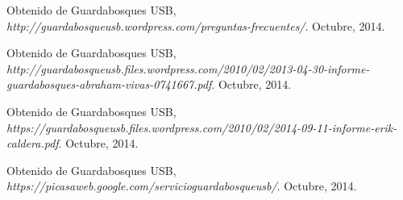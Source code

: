 \begin{thebibliography}{thesis}

  Obtenido de Guardabosques USB,
  \emph{http://guardabosqueusb.wordpress.com/preguntas-frecuentes/}.
  Octubre, 2014.
  
  Obtenido de Guardabosques USB,
  \emph{http://guardabosqueusb.files.wordpress.com/2010/02/2013-04-30-informe-guardabosques-abraham-vivas-0741667.pdf}.
  Octubre, 2014.
  
  Obtenido de Guardabosques USB,
  \emph{https://guardabosqueusb.files.wordpress.com/2010/02/2014-09-11-informe-erik-caldera.pdf}.
  Octubre, 2014.
  
  Obtenido de Guardabosques USB,
  \emph{https://picasaweb.google.com/servicioguardabosqueusb/}.
  Octubre, 2014.

\end{thebibliography}
